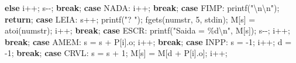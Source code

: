 \documentclass[
  brazilian,
  letterpaper,
]{book}
\newenvironment{Shaded}{\begin{snugshade}}{\end{snugshade}}
\newcommand{\ControlFlowTok}[1]{\textcolor[rgb]{0.00,0.23,0.31}{\textbf{#1}}}
\newcommand{\DecValTok}[1]{\textcolor[rgb]{0.68,0.00,0.00}{#1}}
\newcommand{\NormalTok}[1]{\textcolor[rgb]{0.00,0.23,0.31}{#1}}
\newcommand{\OperatorTok}[1]{\textcolor[rgb]{0.37,0.37,0.37}{#1}}
\newcommand{\SpecialCharTok}[1]{\textcolor[rgb]{0.37,0.37,0.37}{#1}}
\newcommand{\StringTok}[1]{\textcolor[rgb]{0.13,0.47,0.30}{#1}}
\theoremstyle{plain}
\theoremstyle{definition}
\theoremstyle{remark}
\begin{document}
\begin{Shaded}
\begin{Highlighting}[]
            \ControlFlowTok{else}
\NormalTok{                i}\OperatorTok{++;}
\NormalTok{            s}\OperatorTok{{-}{-};}
            \ControlFlowTok{break}\OperatorTok{;}
        \ControlFlowTok{case}\NormalTok{ NADA}\OperatorTok{:}
\NormalTok{            i}\OperatorTok{++;}
            \ControlFlowTok{break}\OperatorTok{;}
        \ControlFlowTok{case}\NormalTok{ FIMP}\OperatorTok{:}
\NormalTok{            printf}\OperatorTok{(}\StringTok{"}\SpecialCharTok{\textbackslash{}n\textbackslash{}n}\StringTok{"}\OperatorTok{);}
            \ControlFlowTok{return}\OperatorTok{;}
        \ControlFlowTok{case}\NormalTok{ LEIA}\OperatorTok{:}
\NormalTok{            s}\OperatorTok{++;}
\NormalTok{            printf}\OperatorTok{(}\StringTok{"? "}\OperatorTok{);}
\NormalTok{            fgets}\OperatorTok{(}\NormalTok{numstr}\OperatorTok{,} \DecValTok{5}\OperatorTok{,}\NormalTok{ stdin}\OperatorTok{);}
\NormalTok{            M}\OperatorTok{[}\NormalTok{s}\OperatorTok{]} \OperatorTok{=}\NormalTok{ atoi}\OperatorTok{(}\NormalTok{numstr}\OperatorTok{);}
\NormalTok{            i}\OperatorTok{++;}
            \ControlFlowTok{break}\OperatorTok{;}
        \ControlFlowTok{case}\NormalTok{ ESCR}\OperatorTok{:}
\NormalTok{            printf}\OperatorTok{(}\StringTok{"Saida = }\SpecialCharTok{\%d\textbackslash{}n}\StringTok{"}\OperatorTok{,}\NormalTok{ M}\OperatorTok{[}\NormalTok{s}\OperatorTok{]);}
\NormalTok{            s}\OperatorTok{{-}{-};}
\NormalTok{            i}\OperatorTok{++;}
            \ControlFlowTok{break}\OperatorTok{;}
        \ControlFlowTok{case}\NormalTok{ AMEM}\OperatorTok{:}
\NormalTok{            s }\OperatorTok{=}\NormalTok{ s }\OperatorTok{+}\NormalTok{ P}\OperatorTok{[}\NormalTok{i}\OperatorTok{].}\NormalTok{o}\OperatorTok{;}
\NormalTok{            i}\OperatorTok{++;}
            \ControlFlowTok{break}\OperatorTok{;}
        \ControlFlowTok{case}\NormalTok{ INPP}\OperatorTok{:}
\NormalTok{            s }\OperatorTok{=} \OperatorTok{{-}}\DecValTok{1}\OperatorTok{;}
\NormalTok{            i}\OperatorTok{++;}
\NormalTok{            d }\OperatorTok{=} \OperatorTok{{-}}\DecValTok{1}\OperatorTok{;}
            \ControlFlowTok{break}\OperatorTok{;}
        \ControlFlowTok{case}\NormalTok{ CRVL}\OperatorTok{:}
\NormalTok{            s }\OperatorTok{=}\NormalTok{ s }\OperatorTok{+} \DecValTok{1}\OperatorTok{;}
\NormalTok{            M}\OperatorTok{[}\NormalTok{s}\OperatorTok{]} \OperatorTok{=}\NormalTok{ M}\OperatorTok{[}\NormalTok{d }\OperatorTok{+}\NormalTok{ P}\OperatorTok{[}\NormalTok{i}\OperatorTok{].}\NormalTok{o}\OperatorTok{];}
\NormalTok{            i}\OperatorTok{++;}

\end{Highlighting}
\end{Shaded}
\end{document}
